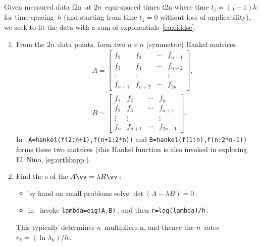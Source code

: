 \begin{procedure} \label{pro:ei}
Given measured data \hlist f{2n}\ at \(2n\)~equi-spaced times \hlist t{2n} where time \(t_j=(j-1)h\) for time-spacing~\(h\) (and starting from time \(t_1=0\) without loss of applicability), we seek to fit the data with a sum of exponentials~\eqref{eq:eiddse}.
\begin{enumerate}
\item\label{pro:eia} From the \(2n\)~data points, form two \(n\times n\) (symmetric) Hankel matrices 
\begin{eqnarray*}&&
A=\begin{bmatrix} f_2&f_3&\cdots&f_{n+1}
\\f_3&f_4&\cdots&f_{n+2}
\\\vdots&\vdots&&\vdots
\\f_{n+1}&f_{n+2}&\cdots&f_{2n} \end{bmatrix},
\\&&
B=\begin{bmatrix} f_1&f_2&\cdots&f_{n}
\\f_2&f_3&\cdots&f_{n+1}
\\\vdots&\vdots&&\vdots
\\f_{n}&f_{n+1}&\cdots&f_{2n-1} \end{bmatrix}.
\end{eqnarray*}
In \script\ \verb|A=hankel(f(2:n+1),f(n+1:2*n))| and \verb|B=hankel(f(1:n),f(n:2*n-1))| forms these two matrices (this Hankel function is also invoked in exploring El~Nino, \autoref{eg:orthbapp}).

\item\label{pro:eib} Find the s of the  \(A\vv=\lambda B\vv\)\,: 
\begin{itemize}
\item by hand on small problems solve \(\det(A-\lambda B)=0\)\,;
\item in \script\ invoke \verb|lambda=eig(A,B)|\,, and then \verb|r=log(lambda)/h|\,.
\end{itemize}
This  typically determines \(n\)~multipliers \hlist\lambda n, and thence the \(n\)~rates \(r_k=(\ln\lambda_k)/h\)\,.


\end{enumerate}
\end{procedure}
